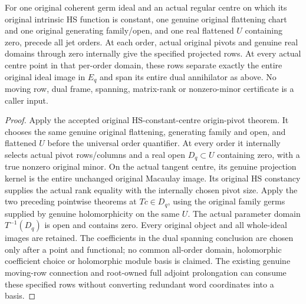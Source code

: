 \begin{theorem}
\label{hir:actual-original-hs-centre-true-jet-dual-spanning}
\leanok
For one original coherent germ ideal and an actual regular centre on
which its original intrinsic HS function is constant, one genuine
original flattening chart and one original generating family/open,
and one real flattened $U$ containing zero, precede all jet orders.
At each order, actual original pivots and genuine real domains through
zero internally give the specified projected rows. At every actual
centre point in that per-order domain, these rows separate exactly
the entire original ideal image in $E_q$ and span its entire dual
annihilator as above. No moving row, dual frame, spanning, matrix-rank
or nonzero-minor certificate is a caller input.
\end{theorem}
\begin{proof}
Apply the accepted original HS-constant-centre origin-pivot theorem.
It chooses the same genuine original flattening, generating family
and open, and flattened $U$ before the universal order quantifier.
At every order it internally selects actual pivot rows/columns and
a real open $D_q\subset U$ containing zero, with a true nonzero
original minor. On the actual tangent centre, its genuine projection
kernel is the entire unchanged original Macaulay image. Its original
HS constancy supplies the actual rank equality with the internally
chosen pivot size. Apply the two preceding pointwise theorems at
$Tc\in D_q$, using the original family germs supplied by genuine
holomorphicity on the same $U$. The actual parameter domain
$T^{-1}(D_q)$ is open and contains zero. Every original object and
all whole-ideal images are retained. The coefficients in the dual
spanning conclusion are chosen only after a point and functional;
no common all-order domain, holomorphic coefficient choice or
holomorphic module basis is claimed. The existing genuine moving-row
connection and root-owned full adjoint prolongation can consume these
specified rows without converting redundant word coordinates into a
basis.
\end{proof}
